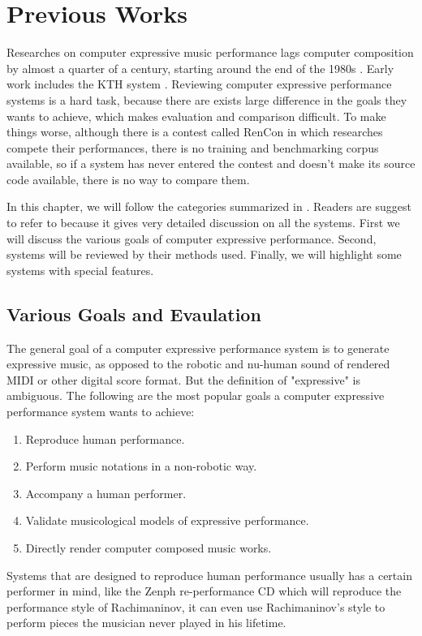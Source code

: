 \chapter{Previous Works}
\label{chap:prev}
Researches on computer expressive music performance lags computer composition by almost a quarter of a century, starting around the end of the 1980s \cite{THEBOOK}. Early work includes the KTH system \cite{THEBOOK}. Reviewing computer expressive performance systems is a hard task, because there are exists large difference in the goals they wants to achieve, which makes evaluation and comparison difficult. To make things worse, although there is a contest called RenCon \cite{RenCon} in which researches compete their performances, there is no training and benchmarking corpus available, so if a system has never entered the contest and doesn't make its source code available, there is no way to compare them.

In this chapter, we will follow the categories summarized in \cite{THEBOOK}. Readers are suggest to refer to \cite{THEBOOK} because it gives very detailed discussion on all the systems. First we will discuss the various goals of computer expressive performance. Second, systems will be reviewed by their methods used. Finally, we will highlight some systems with special features.

\section{Various Goals and Evaulation}
The general goal of a computer expressive performance system is to generate expressive music, as opposed to the robotic and nu-human sound of rendered MIDI or other digital score format. But the definition of "expressive" is ambiguous. The following are the most popular goals a computer expressive performance system wants to achieve:
\begin{enumerate}
   \item Reproduce human performance.
   \item Perform music notations in a non-robotic way.
   \item Accompany a human performer.
   \item Validate musicological models of expressive performance.
   \item Directly render computer composed music works.
\end{enumerate}

Systems that are designed to reproduce human performance usually has a certain performer in mind, like the Zenph re-performance CD \cite{zenph} which will reproduce the performance style of Rachimaninov, it can even use Rachimaninov's style to perform pieces the musician never played in his lifetime. 

